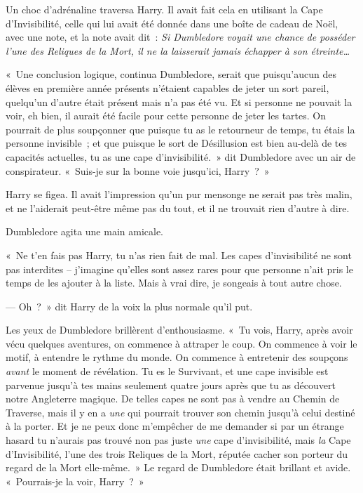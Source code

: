 Un choc d'adrénaline traversa Harry. Il avait fait cela en utilisant la Cape d'Invisibilité, celle qui lui avait été donnée dans une boîte de cadeau de Noël, avec une note, et la note avait dit~: \emph{Si Dumbledore voyait une chance de posséder l'une des Reliques de la Mort, il ne la laisserait jamais échapper à son étreinte…}

«~Une conclusion logique, continua Dumbledore, serait que puisqu'aucun des élèves en première année présents n'étaient capables de jeter un sort pareil, quelqu'un d'autre était présent mais n'a pas été vu. Et si personne ne pouvait la voir, eh bien, il aurait été facile pour cette personne de jeter les tartes. On pourrait de plus soupçonner que puisque tu as le retourneur de temps, tu étais la personne invisible~; et que puisque le sort de Désillusion est bien au-delà de tes capacités actuelles, tu as une cape d'invisibilité.~» dit Dumbledore avec un air de conspirateur. «~Suis-je sur la bonne voie jusqu'ici, Harry~?~»

Harry se figea. Il avait l'impression qu'un pur mensonge ne serait pas très malin, et ne l'aiderait peut-être même pas du tout, et il ne trouvait rien d'autre à dire.

Dumbledore agita une main amicale.

«~Ne t'en fais pas Harry, tu n'as rien fait de mal. Les capes d'invisibilité ne sont pas interdites -- j'imagine qu'elles sont assez rares pour que personne n'ait pris le temps de les ajouter à la liste. Mais à vrai dire, je songeais à tout autre chose.

--- Oh~?~» dit Harry de la voix la plus normale qu'il put.

Les yeux de Dumbledore brillèrent d'enthousiasme. «~Tu vois, Harry, après avoir vécu quelques aventures, on commence à attraper le coup. On commence à voir le motif, à entendre le rythme du monde. On commence à entretenir des soupçons \emph{avant} le moment de révélation. Tu es le Survivant, et une cape invisible est parvenue jusqu'à tes mains seulement quatre jours après que tu as découvert notre Angleterre magique. De telles capes ne sont pas à vendre au Chemin de Traverse, mais il y en a \emph{une} qui pourrait trouver son chemin jusqu'à celui destiné à la porter. Et je ne peux donc m'empêcher de me demander si par un étrange hasard tu n'aurais pas trouvé non pas juste \emph{une} cape d'invisibilité, mais \emph{la} Cape d'Invisibilité, l'une des trois Reliques de la Mort, réputée cacher son porteur du regard de la Mort elle-même.~» Le regard de Dumbledore était brillant et avide. «~Pourrais-je la voir, Harry~?~»

